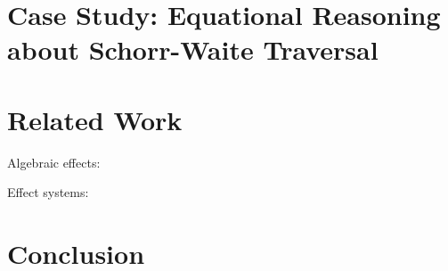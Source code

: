 \documentclass[runningheads]{llncs}
\begin{document}
\section{Case Study: Equational Reasoning about Schorr-Waite Traversal}\label{sec:case}

\section{Related Work}
Algebraic effects:~\cite{Plotkin2002}

Effect systems:~\cite{Lucassen1988,Talpin1992,Marino2009}

\section{Conclusion}
%
%
%


\end{document}

